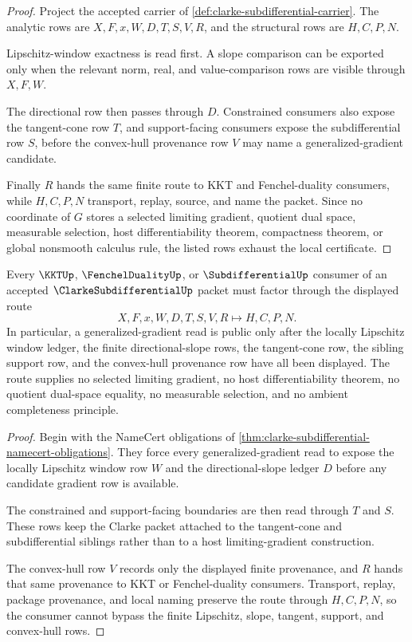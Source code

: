 \begin{proof}
Project the accepted carrier of \autoref{def:clarke-subdifferential-carrier}. The analytic rows are $X,F,x,W,D,T,S,V,R$, and the structural rows are $H,C,P,N$.

Lipschitz-window exactness is read first. A slope comparison can be exported only when the relevant norm, real, and value-comparison rows are visible through $X,F,W$.

The directional row then passes through $D$. Constrained consumers also expose the tangent-cone row $T$, and support-facing consumers expose the subdifferential row $S$, before the convex-hull provenance row $V$ may name a generalized-gradient candidate.

Finally $R$ hands the same finite route to KKT and Fenchel-duality consumers, while $H,C,P,N$ transport, replay, source, and name the packet. Since no coordinate of $G$ stores a selected limiting gradient, quotient dual space, measurable selection, host differentiability theorem, compactness theorem, or global nonsmooth calculus rule, the listed rows exhaust the local certificate.
\end{proof}

\begin{theorem}
\label{thm:clarke-subdifferential-lipschitz-gradient-route}
Every $\KKTUp$, $\FenchelDualityUp$, or $\SubdifferentialUp$ consumer of an accepted $\ClarkeSubdifferentialUp$ packet must factor through the displayed route
$$
X,F,x,W,D,T,S,V,R \longmapsto H,C,P,N .
$$
In particular, a generalized-gradient read is public only after the locally Lipschitz window ledger, the finite directional-slope rows, the tangent-cone row, the sibling support row, and the convex-hull provenance row have all been displayed. The route supplies no selected limiting gradient, no host differentiability theorem, no quotient dual-space equality, no measurable selection, and no ambient completeness principle.
\end{theorem}
\begin{proof}
Begin with the NameCert obligations of \autoref{thm:clarke-subdifferential-namecert-obligations}. They force every generalized-gradient read to expose the locally Lipschitz window row $W$ and the directional-slope ledger $D$ before any candidate gradient row is available.

The constrained and support-facing boundaries are then read through $T$ and $S$. These rows keep the Clarke packet attached to the tangent-cone and subdifferential siblings rather than to a host limiting-gradient construction.

The convex-hull row $V$ records only the displayed finite provenance, and $R$ hands that same provenance to KKT or Fenchel-duality consumers. Transport, replay, package provenance, and local naming preserve the route through $H,C,P,N$, so the consumer cannot bypass the finite Lipschitz, slope, tangent, support, and convex-hull rows.
\end{proof}

